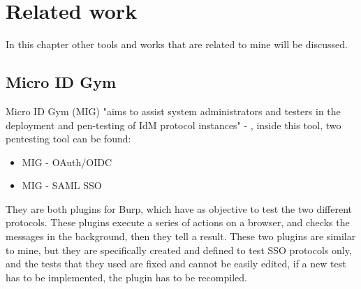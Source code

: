 \chapter{Related work}
In this chapter other tools and works that are related to mine will be discussed.

\section{Micro ID Gym}
Micro ID Gym (MIG) "aims to assist system administrators and testers in the deployment and pen-testing of IdM protocol instances" - \cite{micro_id_gym}, inside this tool, two pentesting tool can be found:
\begin{itemize}
    \item MIG - OAuth/OIDC \cite{claudio_grisenti}
    \item MIG - SAML SSO \cite{stefano_facchini}
\end{itemize}
They are both plugins for Burp, which have as objective to test the two different protocols. These plugins execute a series of actions on a browser, and checks the messages in the background, then they tell a result.
These two plugins are similar to mine, but they are specifically created and defined to test SSO protocols only, and the tests that they used are fixed and cannot be easily edited, if a new test has to be implemented, the plugin has to be recompiled.

